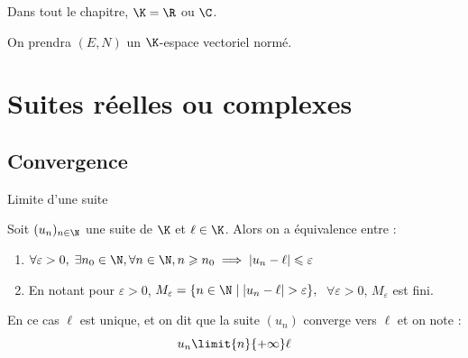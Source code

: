 Dans tout le chapitre, $\K = \R$ ou $\C$.

On prendra $(E, N)$ un $\K$-espace vectoriel normé.

\section{Suites réelles ou complexes}
\subsection{Convergence}

\begin{definition}{Limite d'une suite}{}

    Soit $(u_n)_{n\in\N}$ une suite de $\K$ et $\ell \in \K$. Alors on a équivalence entre : 

    \begin{enumerate}[label=(\roman*)]
        \item $\forall \varepsilon > 0, \; \exists n_0 \in \N, \forall n \in \N, n \geqslant n_0 \implies |u_n - \ell| \leqslant \varepsilon$

        \item En notant pour $\varepsilon > 0$, $M_\varepsilon = \{n \in \N \mid |u_n - \ell| > \varepsilon\},$ 
        $\; \forall \varepsilon > 0, \, M_\varepsilon$ est fini.
    \end{enumerate}
    

    En ce cas $\ell$ est unique, et on dit que la suite $(u_n)$ converge vers $\ell$ et on note  :
    \[u_n \limit{n}{+\infty} \ell\]
\end{definition}


